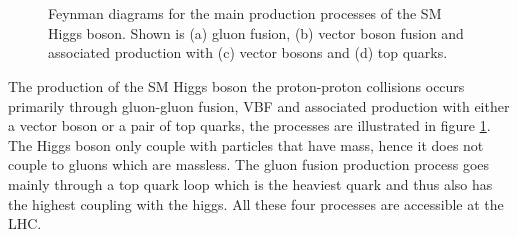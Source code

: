 \begin{figure}[!htb]
 \qquad
{} \\
  \qquad
{} \\
\caption[Feynman diagrams for the main production processes of the SM Higgs
boson.]{Feynman diagrams for the main production processes of the \gls{SM} Higgs
boson. Shown is (a) gluon fusion, (b) vector boson fusion and
associated production with (c) vector bosons and (d) top quarks.}
\label{FIGURE:Theory_SM_SearchingSMHiggs_SMFeynmanDiagrams}
\end{figure}

The production of the \gls{SM} Higgs boson the proton-proton collisions occurs primarily through gluon-gluon fusion, \gls{VBF} and associated production with either a vector boson or a pair of top quarks, the processes are illustrated in figure \ref{FIGURE:Theory_SM_SearchingSMHiggs_SMFeynmanDiagrams}. The Higgs boson only couple with particles that have mass, hence it does not couple to gluons which are massless. The gluon fusion production process goes mainly through a top quark loop which is the heaviest quark and thus also has the highest coupling with the higgs. All these four processes are accessible at the \gls{LHC}.

